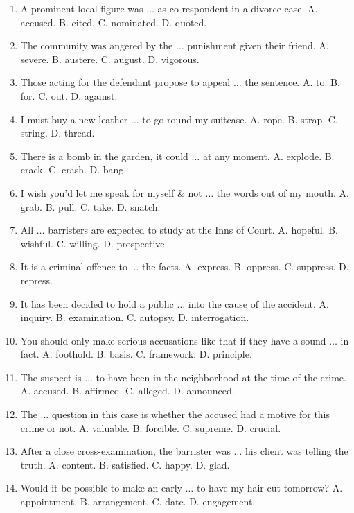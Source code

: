 \documentclass{article}
\numberwithin{equation}{section}
\begin{document}
\begin{enumerate}[leftmargin=8mm]
	\item A prominent local figure was $\ldots$ as co-respondent in a divorce case. {\sf A.} accused. {\sf B.} cited. {\sf C.} nominated. {\sf D.} quoted.
	\item The community was angered by the $\ldots$ punishment given their friend. {\sf A.} severe. {\sf B.} austere. {\sf C.} august. {\sf D.} vigorous.
	\item Those acting for the defendant propose to appeal $\ldots$ the sentence. {\sf A.} to. {\sf B.} for. {\sf C.} out. {\sf D.} against.
	\item I must buy a new leather $\ldots$ to go round my suitcase. {\sf A.} rope. {\sf B.} strap. {\sf C.} string. {\sf D.} thread.
	\item There is a bomb in the garden, it could $\ldots$ at any moment. {\sf A.} explode. {\sf B.} crack. {\sf C.} crash. {\sf D.} bang.
	\item I wish you'd let me speak for myself \& not $\ldots$ the words out of my mouth. {\sf A.} grab. {\sf B.} pull. {\sf C.} take. {\sf D.} snatch.
	\item All $\ldots$ barristers are expected to study at the Inns of Court. {\sf A.} hopeful. {\sf B.} wishful. {\sf C.} willing. {\sf D.} prospective.
	\item It is a criminal offence to $\ldots$ the facts. {\sf A.} express. {\sf B.} oppress. {\sf C.} suppress. {\sf D.} repress.
	\item It has been decided to hold a public $\ldots$ into the cause of the accident. {\sf A.} inquiry. {\sf B.} examination. {\sf C.} autopsy. {\sf D.} interrogation.
	\item You should only make serious accusations like that if they have a sound $\ldots$ in fact. {\sf A.} foothold. {\sf B.} basis. {\sf C.} framework. {\sf D.} principle.
	\item The suspect is $\ldots$ to have been in the neighborhood at the time of the crime. {\sf A.} accused. {\sf B.} affirmed. {\sf C.} alleged. {\sf D.} announced.
	\item The $\ldots$ question in this case is whether the accused had a motive for this crime or not. {\sf A.} valuable. {\sf B.} forcible. {\sf C.} supreme. {\sf D.} crucial.
	\item After a close cross-examination, the barrister was $\ldots$ his client was telling the truth. {\sf A.} content. {\sf B.} satisfied. {\sf C.} happy. {\sf D.} glad.
	\item Would it be possible to make an early $\ldots$ to have my hair cut tomorrow? {\sf A.} appointment. {\sf B.} arrangement. {\sf C.} date. {\sf D.} engagement.

\end{enumerate}
\end{document}
